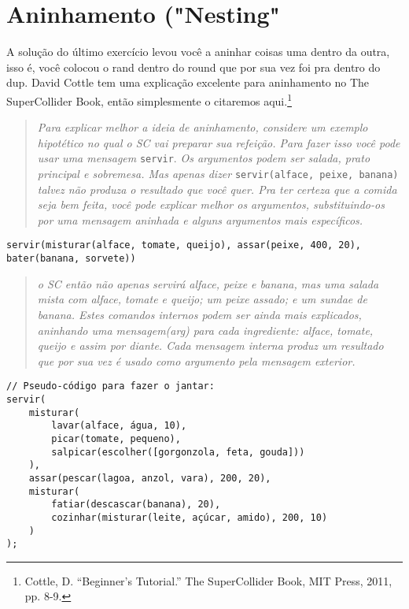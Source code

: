\section{Aninhamento ("Nesting"}
\label{sec:nesting}

A solução do último exercício levou você a aninhar coisas uma dentro da outra, isso é, você colocou o rand dentro do round que por sua vez foi pra dentro do dup. David Cottle tem uma explicação excelente para aninhamento no The SuperCollider Book, então simplesmente o citaremos aqui.\footnote{Cottle, D. ``Beginner's Tutorial.'' The SuperCollider Book, MIT Press, 2011, pp. 8-9.}

\begin{quotation}
\textit{Para explicar melhor a ideia de aninhamento, considere um exemplo hipotético no qual o SC vai preparar sua refeição. Para fazer isso você pode usar uma mensagem} \texttt{servir}. \textit{Os argumentos podem ser salada, prato principal e sobremesa. Mas apenas dizer} \texttt{servir(alface, peixe, banana)} \textit{talvez não produza o resultado que você quer. Pra ter certeza que a comida seja bem feita, você pode explicar melhor os argumentos, substituindo-os por uma mensagem aninhada e alguns argumentos mais específicos.}
\end{quotation}

\texttt{servir(misturar(alface, tomate, queijo), assar(peixe, 400, 20), bater(banana, sorvete))
}
\begin{quotation}
\textit{o SC então não apenas servirá alface, peixe e banana, mas uma salada mista com alface, tomate e queijo; um peixe assado; e um sundae de banana. Estes comandos internos podem ser ainda mais explicados, aninhando uma mensagem(arg) para cada ingrediente: alface, tomate, queijo e assim por diante. Cada mensagem interna produz um resultado que por sua vez é usado como argumento pela mensagem exterior.}
\end{quotation}

\begin{lstlisting}[style=SuperCollider-IDE, basicstyle=\scttfamily\footnotesize, label=code-dinner]
// Pseudo-código para fazer o jantar: 
servir(
	misturar(
		lavar(alface, água, 10),
		picar(tomate, pequeno),
		salpicar(escolher([gorgonzola, feta, gouda]))
	),
	assar(pescar(lagoa, anzol, vara), 200, 20),
	misturar(
		fatiar(descascar(banana), 20),
		cozinhar(misturar(leite, açúcar, amido), 200, 10)
	)
);
\end{lstlisting}

